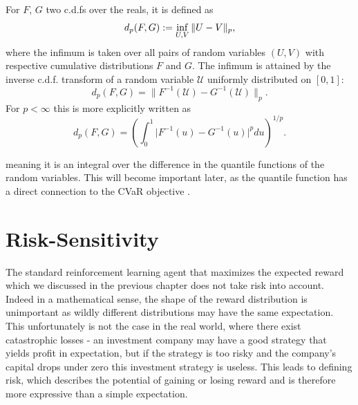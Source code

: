 For $F$, $G$ two c.d.fs over the reals, it is defined as
\begin{equation*}
d_p(F, G) := \inf_{U, V} \| U - V \|_p,
\end{equation*}
where the infimum is taken over all pairs of random variables $(U, V)$ with respective cumulative distributions $F$ and $G$. The infimum is attained by the inverse c.d.f. transform of a random variable $\mathcal{U}$ uniformly distributed on $[0, 1]$:
\begin{equation*}
d_p(F, G) = \| F^{-1}(\mathcal{U}) - G^{-1}(\mathcal{U}) \|_p .
\end{equation*}
For $p < \infty$ this is more explicitly written as
\begin{equation}
d_p(F, G) = \left ( \int_0^1 \big | F^{-1}(u) - G^{-1}(u) \big |^p du \right )^{1/p} .
\end{equation}

meaning it is an integral over the difference in the quantile functions of the random variables. This will become important later, as the quantile function has a direct connection to the CVaR objective .




\section{Risk-Sensitivity}\label{sec:prelim:risk}

The standard reinforcement learning agent that maximizes the expected reward which we discussed in the previous chapter does not take risk into account. Indeed in a mathematical sense, the shape of the reward distribution is unimportant as wildly different distributions may have the same expectation. This unfortunately is not the case in the real world, where there exist catastrophic losses - an investment company may have a good strategy that yields profit in expectation, but if the strategy is too risky and the company's capital drops under zero this investment strategy is useless. This leads to defining risk, which describes the potential of gaining or losing reward and is therefore more expressive than a simple expectation.


